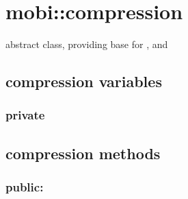 \documentclass[letterpaper,10pt,english]{sphinxmanual}
\begin{document}
\section{mobi::compression}
\label{compression:mobi-compression}\label{compression::doc}

\begin{fulllineitems}
\label{compression:mobi::compression}
abstract class, providing base for {\hyperref[compression:mobi::pd_compression]{}}, {\hyperref[compression:mobi::no_compression]{}}
and {\hyperref[compression:mobi::hd_compression]{}}

\end{fulllineitems}



\subsection{compression variables}
\label{compression:compression-variables}

\subsubsection{private}
\label{compression:private}\begin{quote}

\begin{fulllineitems}
\label{compression:destination__ss}
\end{fulllineitems}

\end{quote}


\subsection{compression methods}
\label{compression:compression-methods}

\subsubsection{public:}
\label{compression:public}
\end{document}
